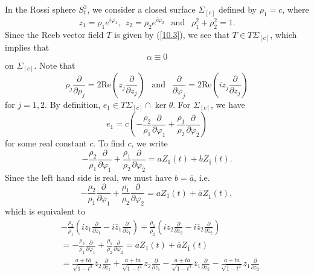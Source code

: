 \documentclass{amsart}
\theoremstyle{Corollary}
\numberwithin{equation}{section}
\begin{document}
In the Rossi sphere $S^3_t$, we consider 
a closed surface $\Sigma_{[c]}$ defined by 
$\rho_1=c$, 
where 
$$z_1=\rho_1 e^{i\varphi_1},~~ z_2=\rho_2 e^{i\varphi_2}~~\mbox{ and }~~
\rho_1^2+\rho_2^2=1.$$
Since the Reeb vector field $T$ is given by (\ref{10.3}), 
we see that $T\in T\Sigma_{[c]}$, which implies that 
\begin{equation}\label{10.6A}
\alpha\equiv 0
\end{equation}
on $\Sigma_{[c]}$. 
Note that  
\begin{equation}\label{10.7}
\rho_j\frac{\partial}{\partial\rho_j}=2\mbox{Re}\left(z_j\frac{\partial}{\partial z_j}\right)~~\mbox{ and }~~
\frac{\partial}{\partial\varphi_j}=2\mbox{Re}\left(iz_j\frac{\partial}{\partial z_j}\right)
\end{equation}
for $j=1,2$. 
By definition, $e_1\in T\Sigma_{[c]}\cap \ker\theta$. 
For $\Sigma_{[c]}$, we have
\begin{equation}\label{10.8}
e_1=c\left(-\frac{\rho_2}{\rho_1}\frac{\partial}{\partial\varphi_1}+\frac{\rho_1}{\rho_2}\frac{\partial}{\partial\varphi_2}\right)
\end{equation}
for some real constant $c$. 
To find $c$, we write 
$$
-\frac{\rho_2}{\rho_1}\frac{\partial}{\partial\varphi_1}+\frac{\rho_1}{\rho_2}\frac{\partial}{\partial\varphi_2}=aZ_1(t)+bZ_{\overline{1}}(t).$$
Since the left hand side is real, we must have $b=\overline{a}$, i.e. 
\begin{equation}\label{10.13}
-\frac{\rho_2}{\rho_1}\frac{\partial}{\partial\varphi_1}+\frac{\rho_1}{\rho_2}\frac{\partial}{\partial\varphi_2}=aZ_1(t)+\overline{a}Z_{\overline{1}}(t),
\end{equation}
which is equivalent to
\begin{equation}\label{10.9}
\begin{split}
&-\frac{\rho_2}{\rho_1}\left(iz_1\frac{\partial}{\partial z_1}-i\overline{z}_1\frac{\partial}{\partial \overline{z}_1}\right)+\frac{\rho_1}{\rho_2}\left(iz_2\frac{\partial}{\partial z_2}-i\overline{z}_2\frac{\partial}{\partial \overline{z}_2}\right)\\
&=-\frac{\rho_2}{\rho_1}\frac{\partial}{\partial\varphi_1}+\frac{\rho_1}{\rho_2}\frac{\partial}{\partial\varphi_2}=aZ_1(t)+\overline{a}Z_{\overline{1}}(t)\\
&=\frac{a+t\overline{a}}{\sqrt{1-t^2}}\overline{z}_2\frac{\partial}{\partial z_1}
+\frac{\overline{a}+ta}{\sqrt{1-t^2}}z_2\frac{\partial}{\partial \overline{z}_1}
-\frac{a+t\overline{a}}{\sqrt{1-t^2}}\overline{z}_1\frac{\partial}{\partial z_2}
-\frac{\overline{a}+ta}{\sqrt{1-t^2}}z_1\frac{\partial}{\partial \overline{z}_2}
\end{split}
\end{equation}
\end{document}
